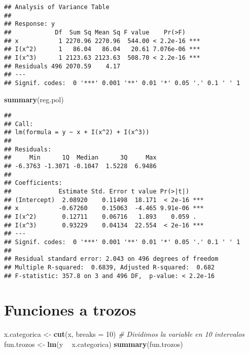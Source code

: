 \documentclass[
]{book}
\newenvironment{Shaded}{\begin{snugshade}}{\end{snugshade}}
\newcommand{\CommentTok}[1]{\textcolor[rgb]{0.56,0.35,0.01}{\textit{#1}}}
\newcommand{\DataTypeTok}[1]{\textcolor[rgb]{0.13,0.29,0.53}{#1}}
\newcommand{\DecValTok}[1]{\textcolor[rgb]{0.00,0.00,0.81}{#1}}
\newcommand{\KeywordTok}[1]{\textcolor[rgb]{0.13,0.29,0.53}{\textbf{#1}}}
\newcommand{\NormalTok}[1]{#1}
\newcommand{\OperatorTok}[1]{\textcolor[rgb]{0.81,0.36,0.00}{\textbf{#1}}}
\newcommand{\StringTok}[1]{\textcolor[rgb]{0.31,0.60,0.02}{#1}}
\begin{document}
\begin{verbatim}
## Analysis of Variance Table
## 
## Response: y
##            Df  Sum Sq Mean Sq F value    Pr(>F)    
## x           1 2270.96 2270.96  544.00 < 2.2e-16 ***
## I(x^2)      1   86.04   86.04   20.61 7.076e-06 ***
## I(x^3)      1 2123.63 2123.63  508.70 < 2.2e-16 ***
## Residuals 496 2070.59    4.17                      
## ---
## Signif. codes:  0 '***' 0.001 '**' 0.01 '*' 0.05 '.' 0.1 ' ' 1
\end{verbatim}

\begin{Shaded}
\begin{Highlighting}[]
\KeywordTok{summary}\NormalTok{(reg.pol)}
\end{Highlighting}
\end{Shaded}

\begin{verbatim}
## 
## Call:
## lm(formula = y ~ x + I(x^2) + I(x^3))
## 
## Residuals:
##     Min      1Q  Median      3Q     Max 
## -6.3763 -1.3071 -0.1047  1.5228  6.9486 
## 
## Coefficients:
##             Estimate Std. Error t value Pr(>|t|)    
## (Intercept)  2.08920    0.11498  18.171  < 2e-16 ***
## x           -0.67260    0.15063  -4.465 9.91e-06 ***
## I(x^2)       0.12711    0.06716   1.893    0.059 .  
## I(x^3)       0.93229    0.04134  22.554  < 2e-16 ***
## ---
## Signif. codes:  0 '***' 0.001 '**' 0.01 '*' 0.05 '.' 0.1 ' ' 1
## 
## Residual standard error: 2.043 on 496 degrees of freedom
## Multiple R-squared:  0.6839, Adjusted R-squared:  0.682 
## F-statistic: 357.8 on 3 and 496 DF,  p-value: < 2.2e-16
\end{verbatim}

\hypertarget{funciones-a-trozos}{%
\section{Funciones a trozos}\label{funciones-a-trozos}}

\begin{Shaded}
\begin{Highlighting}[]
\NormalTok{x.categorica <-}\StringTok{ }\KeywordTok{cut}\NormalTok{(x, }\DataTypeTok{breaks =} \DecValTok{10}\NormalTok{) }\CommentTok{# Dividimos la variable en 10 intervalos}
\NormalTok{fun.trozos <-}\StringTok{ }\KeywordTok{lm}\NormalTok{(y }\OperatorTok{~}\StringTok{ }\NormalTok{x.categorica)}
\KeywordTok{summary}\NormalTok{(fun.trozos)}
\end{Highlighting}
\end{Shaded}
\end{document}
